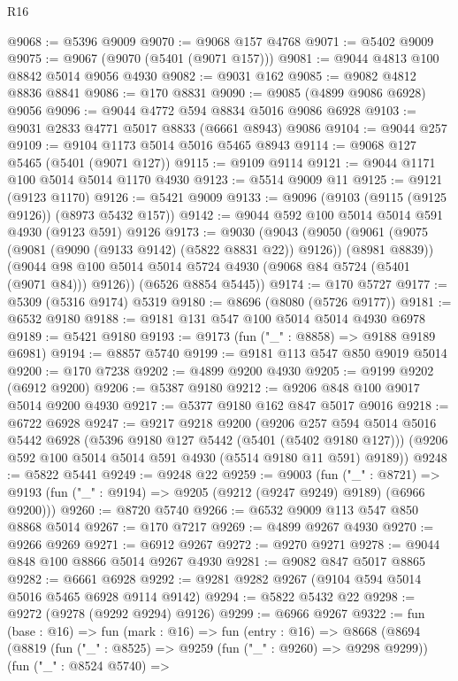 \begin{lexlean}{R16}
\begin{coremodule}
@9068 := @5396 @9009
@9070 := @9068 @157 @4768
@9071 := @5402 @9009
@9075 := @9067 (@9070 (@5401 (@9071 @157)))
@9081 := @9044 @4813 @100 @8842 @5014 @9056 @4930
@9082 := @9031 @162
@9085 := @9082 @4812 @8836 @8841
@9086 := @170 @8831
@9090 := @9085 (@4899 @9086 @6928) @9056
@9096 := @9044 @4772 @594 @8834 @5016 @9086 @6928
@9103 := @9031 @2833 @4771 @5017 @8833 (@6661 @8943) @9086
@9104 := @9044 @257
@9109 := @9104 @1173 @5014 @5016 @5465 @8943
@9114 := @9068 @127 @5465 (@5401 (@9071 @127))
@9115 := @9109 @9114
@9121 := @9044 @1171 @100 @5014 @5014 @1170 @4930
@9123 := @5514 @9009 @11
@9125 := @9121 (@9123 @1170)
@9126 := @5421 @9009
@9133 := @9096 (@9103 (@9115 (@9125 @9126)) (@8973 @5432 @157))
@9142 := @9044 @592 @100 @5014 @5014 @591 @4930 (@9123 @591) @9126
@9173 := @9030
    (@9043
      (@9050
        (@9061 (@9075 (@9081 (@9090 (@9133 @9142) (@5822 @8831 @22)) @9126)) (@8981 @8839))
        (@9044 @98 @100 @5014 @5014 @5724 @4930 (@9068 @84 @5724 (@5401 (@9071 @84))) @9126))
      (@6526 @8854 @5445))
@9174 := @170 @5727
@9177 := @5309 (@5316 @9174) @5319
@9180 := @8696 (@8080 (@5726 @9177))
@9181 := @6532 @9180
@9188 := @9181 @131 @547 @100 @5014 @5014 @4930 @6978
@9189 := @5421 @9180
@9193 := @9173 (fun ("_" : @8858) => @9188 @9189 @6981)
@9194 := @8857 @5740
@9199 := @9181 @113 @547 @850 @9019 @5014
@9200 := @170 @7238
@9202 := @4899 @9200 @4930
@9205 := @9199 @9202 (@6912 @9200)
@9206 := @5387 @9180
@9212 := @9206 @848 @100 @9017 @5014 @9200 @4930
@9217 := @5377 @9180 @162 @847 @5017 @9016
@9218 := @6722 @6928
@9247 := @9217
    @9218
    @9200
    (@9206
      @257
      @594
      @5014
      @5016
      @5442
      @6928
      (@5396 @9180 @127 @5442 (@5401 (@5402 @9180 @127)))
      (@9206 @592 @100 @5014 @5014 @591 @4930 (@5514 @9180 @11 @591) @9189))
@9248 := @5822 @5441
@9249 := @9248 @22
@9259 := @9003
    (fun ("_" : @8721) =>
    @9193 (fun ("_" : @9194) => @9205 (@9212 (@9247 @9249) @9189) (@6966 @9200)))
@9260 := @8720 @5740
@9266 := @6532 @9009 @113 @547 @850 @8868 @5014
@9267 := @170 @7217
@9269 := @4899 @9267 @4930
@9270 := @9266 @9269
@9271 := @6912 @9267
@9272 := @9270 @9271
@9278 := @9044 @848 @100 @8866 @5014 @9267 @4930
@9281 := @9082 @847 @5017 @8865
@9282 := @6661 @6928
@9292 := @9281 @9282 @9267 (@9104 @594 @5014 @5016 @5465 @6928 @9114 @9142)
@9294 := @5822 @5432 @22
@9298 := @9272 (@9278 (@9292 @9294) @9126)
@9299 := @6966 @9267
@9322 := fun (base : @16) =>
  fun (mark : @16) =>
  fun (entry : @16) =>
  @8668
    (@8694
      (@8819
        (fun ("_" : @8525) => @9259 (fun ("_" : @9260) => @9298 @9299))
        (fun ("_" : @8524 @5740) =>

\end{coremodule}
\end{lexlean}
